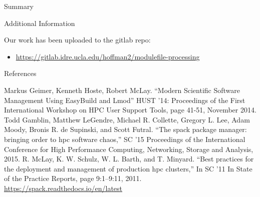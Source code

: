 \documentclass[final]{beamer}
\newlength{\onecolwid}
\begin{document}
\begin{frame}[t]
\begin{columns}[t]
\begin{column}{\onecolwid}
\begin{block}{Summary}
\end{block}


\begin{block}{Additional Information}

Our work has been uploaded to the gitlab repo:
\begin{itemize}
\item \href{https://gitlab.idre.ucla.edu/hoffman2/modulefile-processing}{https://gitlab.idre.ucla.edu/hoffman2/modulefile-processing}
\end{itemize}

\end{block}


\begin{block}{References}

\nocite{*} %
\small{

\begin{thebibliography}{00}
 Markus Geimer, Kenneth Hoste, Robert McLay. ``Modern Scientific Software Management Using EasyBuild and Lmod'' HUST '14: Proceedings of the First International Workshop on HPC User Support Tools, page 41-51, November 2014.
 Todd Gamblin, Matthew LeGendre, Michael R. Collette, Gregory L. Lee, Adam Moody, Bronis R. de Supinski, and Scott Futral. ``The spack package manager: bringing order to hpc software chaos,'' SC ’15 Proceedings of the International Conference for High Performance Computing, Networking, Storage and Analysis, 2015.
 R. McLay, K. W. Schulz, W. L. Barth, and T. Minyard. ``Best practices for the deployment and management of production hpc clusters,'' In SC ’11 In State of the Practice Reports, page 9:1–9:11, 2011.
 \href{https://spack.readthedocs.io/en/latest}{https://spack.readthedocs.io/en/latest}
\end{thebibliography}
}


\end{block}
\end{column}
\end{columns}
\end{frame}
\end{document}
